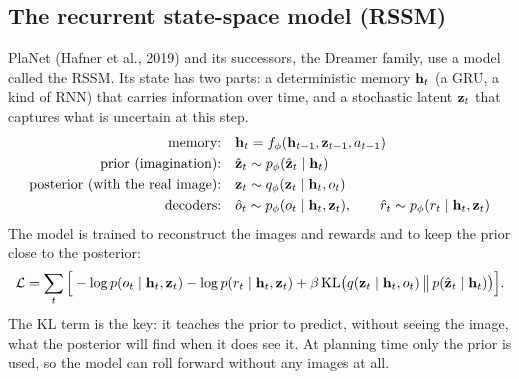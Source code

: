 \subsection{The recurrent state-space model (RSSM)}
PlaNet (Hafner et al., 2019) and its successors, the Dreamer family, use a model called the RSSM. Its state has two parts: a deterministic memory $\mathbf{h}_t$ (a GRU, a kind of RNN) that carries information over time, and a stochastic latent $\mathbf{z}_t$ that captures what is uncertain at this step.
\begin{align}
\text{memory:}\quad & \mathbf{h}_t=f_\phi(\mathbf{h}_{t-1},\mathbf{z}_{t-1},a_{t-1})\\
\text{prior (imagination):}\quad & \hat{\mathbf{z}}_t\sim p_\phi(\hat{\mathbf{z}}_t\mid\mathbf{h}_t)\\
\text{posterior (with the real image):}\quad & \mathbf{z}_t\sim q_\phi(\mathbf{z}_t\mid\mathbf{h}_t,o_t)\\
\text{decoders:}\quad & \hat o_t\sim p_\phi(o_t\mid\mathbf{h}_t,\mathbf{z}_t),\qquad \hat r_t\sim p_\phi(r_t\mid\mathbf{h}_t,\mathbf{z}_t)
\end{align}
The model is trained to reconstruct the images and rewards and to keep the prior close to the posterior:
\begin{equation}
\label{eq:rssmloss}\mathcal L=\sum_t\Big[-\log p(o_t\mid\mathbf{h}_t,\mathbf{z}_t)-\log p(r_t\mid\mathbf{h}_t,\mathbf{z}_t)+\beta\,\mathrm{KL}\big(q(\mathbf{z}_t\mid\mathbf{h}_t,o_t)\,\big\|\,p(\hat{\mathbf{z}}_t\mid\mathbf{h}_t)\big)\Big].
\end{equation}
The KL term is the key: it teaches the prior to predict, without seeing the image, what the posterior will find when it does see it. At planning time only the prior is used, so the model can roll forward without any images at all.

